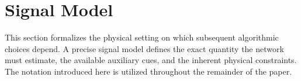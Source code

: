 \documentclass[journal,10pt]{IEEEtran}
\newcommand{\R}{\mathbb{R}}
\newcommand{\C}{\mathbb{C}}
\newcommand{\bY}{\mathbf{Y}}
\newcommand{\bs}{\mathbf{s}}
\newcommand{\Fcal}{\mathcal{F}}
\newcommand{\STFT}{\mathrm{STFT}}
\newcommand{\conv}{\circledast}
\begin{document}


\section{Signal Model}
\label{sec:signal_model}
This section formalizes the physical setting on which subsequent algorithmic choices depend. A precise signal model defines the exact quantity the network must estimate, the available auxiliary cues, and the inherent physical constraints. The notation introduced here is utilized throughout the remainder of the paper.
\end{document}

